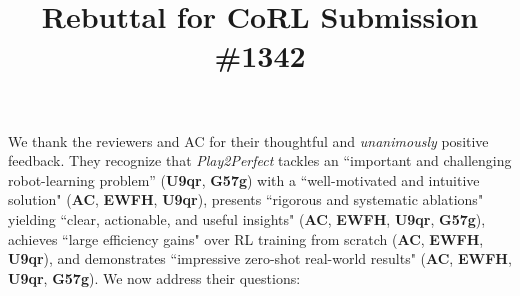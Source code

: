 \documentclass[conference]{IEEEtran}
\newcommand{\AC}{\textcolor{revGreen}{\textbf{AC}}}
\newcommand{\revA}{\textcolor{revBlue}{\textbf{EWFH}}}
\newcommand{\revB}{\textcolor{revOrange}{\textbf{U9qr}}}
\newcommand{\revC}{\textcolor{revPurple}{\textbf{G57g}}}
\begin{document}
\title{Rebuttal  for CoRL Submission \#1342\vspace{-1cm}}
\maketitle
\thispagestyle{empty}



We thank the reviewers and AC for their thoughtful and \textit{unanimously} positive feedback. They recognize that \textit{Play2Perfect} tackles an ``important and challenging robot-learning problem'' (\revB, \revC) with a ``well-motivated and intuitive solution" (\AC, \revA, \revB), presents ``rigorous and systematic ablations" yielding ``clear, actionable, and useful insights" (\AC, \revA, \revB, \revC), achieves ``large efficiency gains" over RL training from scratch (\AC, \revA, \revB), and demonstrates ``impressive zero-shot real-world results" (\AC, \revA, \revB, \revC). We now address their questions:

\end{document}
